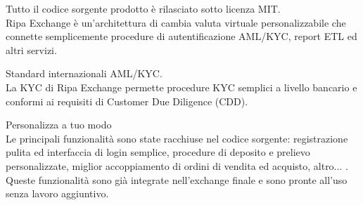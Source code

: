 \documentclass[11pt,fleqn,oneside]{book} %
\begin{document}
\begin{tcolorbox}[featureBox,
	title=\textsc{Open Source} \faCircleONotch]

	\small	Tutto il codice sorgente prodotto è rilasciato sotto licenza MIT.\\\vspace{5mm}
	\tiny Ripa Exchange è un'architettura di cambia valuta virtuale personalizzabile che connette semplicemente procedure
	di autentificazione AML/KYC, report ETL ed altri servizi.
\end{tcolorbox}
\begin{tcolorbox}[featureBox,
	title=\textsc{Conforme} \faCheck]

	\small Standard internazionali AML/KYC.\\\vspace{5mm}
	\tiny La KYC di Ripa Exchange permette procedure KYC semplici a livello bancario e conformi ai requisiti di 
	Customer Due Diligence (CDD).
\end{tcolorbox}
\begin{tcolorbox}[featureBox,
	title=\textsc{Trasparente e Configurabile} \faCogs]

	\small Personalizza a tuo modo\\\vspace{5mm}
	\tiny Le principali funzionalità sono state racchiuse nel codice sorgente: registrazione pulita ed 
	interfaccia di login semplice, procedure di deposito e prelievo personalizzate, miglior accoppiamento di ordini 
	di vendita ed acquisto, altro... . Queste funzionalità sono già integrate nell'exchange finale e sono pronte all'uso
	senza lavoro aggiuntivo. 
\end{tcolorbox}
\end{document}
